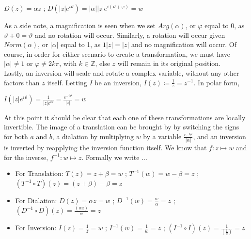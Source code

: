 \documentclass[a4paper,man,natbib]{apa6}
\newcommand{\Z}{\mathbb{Z}}  %
\begin{document}
\begin{center}

      $ D(z) = \alpha z $ ; $ D(|z|e^{i\vartheta}) = |\alpha ||z|e^{i(\vartheta + \varphi)} = w $

\end{center}

As a side note, a magnification is seen when we set $ Arg(\alpha) $, or $ \varphi $ equal to 0, as $ \vartheta + 0 = \vartheta $ and no rotation will occur.
Similarly, a rotation will occur given $ Norm(\alpha) $, or $ |\alpha| $ equal to 1, as $ 1|z| = |z| $ and no magnification will occur.
Of course, in order for either scenario to create a transformation, we must have $ |\alpha| \neq 1 $ or $ \varphi \neq 2k\pi $, with $ k \in \Z $, else $ z $ will remain in its original position.
\\
Lastly, an inversion will scale and rotate a complex variable, without any other factors than $ z $ itself.
Letting $ I $ be an inversion, $ I(z) \coloneqq \frac{1}{z} = z^{-1}$. In polar form,

\begin{center}

      $ I(|z|e^{i\vartheta}) = \frac{1}{|z|e^{i\vartheta}} = \frac{e^{-i\vartheta}}{|z|} = w $

\end{center}

At this point it should be clear that each one of these transformations are locally invertible.
The image of a translation can be brought by by switching the signs for both $ a $ and $ b $,
a dialation by multiplying $ w $ by a variable $ \frac{e^{-i\varphi}}{|\alpha|} $, and an inversion is inverted by reapplying the inversion function itself.
We know that $ f : z \mapsto w $ and for the inverse, $  f^{-1}: w \mapsto z $. Formally we write ...

\begin{itemize}

      \item For Translation: $ T(z) = z + \beta = w $ ; $ T^{-1}(w) = w - \beta = z $ ; $ (T^{-1} \circ  T)(z) = (z + \beta) - \beta = z  $

      \item For Dialation: $ D(z) = \alpha z = w $ ; $ D^{-1}(w) = \frac{w}{\alpha} = z $ ; $ (D^{-1} \circ  D)(z) = \frac{(\alpha z)}{\alpha} = z $

      \item For Inversion: $ I(z) = \frac{1}{z} = w $ ; $ I^{-1}(w) = \frac{1}{w} = z $ ; $ (I^{-1} \circ  I)(z) = \frac{1}{(\frac{1}{z})} = z $

\end{itemize}
\end{document}
